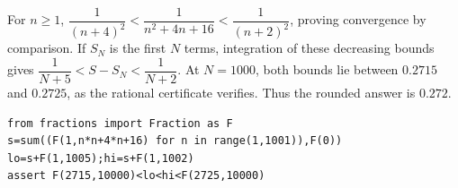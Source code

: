 For $n\ge1$, $\dfrac{1}{(n+4)^2}<\dfrac{1}{n^2+4n+16}<\dfrac{1}{(n+2)^2}$, proving convergence by comparison. If $S_N$ is the first $N$ terms, integration of these decreasing bounds gives $\dfrac{1}{N+5}<S-S_N<\dfrac{1}{N+2}$. At $N=1000$, both bounds lie between $0.2715$ and $0.2725$, as the rational certificate verifies. Thus the rounded answer is $\boxed{0.272}$.\begin{verbatim}
from fractions import Fraction as F
s=sum((F(1,n*n+4*n+16) for n in range(1,1001)),F(0))
lo=s+F(1,1005);hi=s+F(1,1002)
assert F(2715,10000)<lo<hi<F(2725,10000)
\end{verbatim}
